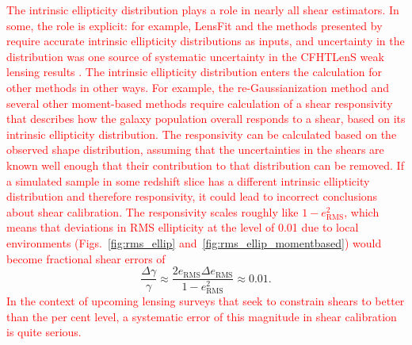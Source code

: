\documentclass[twocolumn,useAMS,usenatbib]{mn2e}
\newcommand{\rachel}[1]{{\textcolor{red}{#1}}}
\begin{document}
\rachel{The intrinsic ellipticity distribution plays a role in nearly all
shear estimators.  In some, the role is explicit: for example, LensFit
\citep{2007MNRAS.382..315M,2008MNRAS.390..149K,2013MNRAS.429.2858M}
and the methods presented by \cite{2014MNRAS.438.1880B} require
accurate intrinsic ellipticity distributions as inputs, and
uncertainty in the distribution was one source of
systematic uncertainty in the CFHTLenS weak lensing results
\citep{2013MNRAS.432.2433H,2013MNRAS.429.2858M}.  The intrinsic
ellipticity distribution enters the calculation for other methods in
other ways.  For example, the re-Gaussianization method and several
other moment-based methods require calculation of a shear responsivity
\citep{BJ02,HS03} that describes how the galaxy population overall
responds to a shear, based on its intrinsic ellipticity distribution.
The responsivity can be calculated based on the observed shape
distribution, assuming that the uncertainties in the shears are known
well enough that their contribution to that distribution can be removed.
If a simulated sample in some redshift slice has a different intrinsic
ellipticity distribution and therefore responsivity, it could lead to
incorrect conclusions about shear calibration.  The responsivity
scales roughly like $1-e_\text{RMS}^2$, which means that deviations in
RMS ellipticity at the level of 0.01 due to local environments (Figs.~\ref{fig:rms_ellip} and~\ref{fig:rms_ellip_momentbased}) would become fractional shear
errors of}
\begin{equation}
\frac{\Delta\gamma}{\gamma} \approx \frac{2 e_\text{RMS} \Delta
  e_\text{RMS} }{1-e_\text{RMS}^2} \approx 0.01.
\end{equation}
\rachel{In the context of upcoming lensing surveys that seek to constrain
shears to better than the per cent level, a systematic error of this
magnitude in shear calibration is quite serious.}
\end{document}
